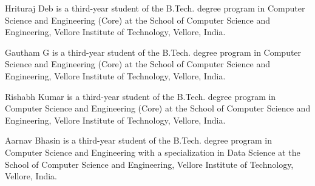 \documentclass{ieeeaccess}
\begin{document}

\begin{IEEEbiographynophoto}{Hrituraj Deb}
is a third-year student of the B.Tech. degree program in Computer Science and Engineering (Core) at the School of Computer Science and Engineering, Vellore Institute of Technology, Vellore, India.
\end{IEEEbiographynophoto}

\begin{IEEEbiographynophoto}{Gautham G}
is a third-year student of the B.Tech. degree program in Computer Science and Engineering (Core) at the School of Computer Science and Engineering, Vellore Institute of Technology, Vellore, India.
\end{IEEEbiographynophoto}

\begin{IEEEbiographynophoto}{Rishabh Kumar}
is a third-year student of the B.Tech. degree program in Computer Science and Engineering (Core) at the School of Computer Science and Engineering, Vellore Institute of Technology, Vellore, India.
\end{IEEEbiographynophoto}

\begin{IEEEbiographynophoto}{Aarnav Bhasin}
is a third-year student of the B.Tech. degree program in Computer Science and Engineering with a specialization in Data Science at the School of Computer Science and Engineering, Vellore Institute of Technology, Vellore, India.
\end{IEEEbiographynophoto}

\EOD
\end{document}
